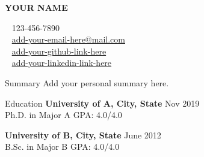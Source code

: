 \documentclass{resume} %
\begin{document}
\begin{minipage}{.6\textwidth}
\Huge \textbf{YOUR NAME}
\end{minipage}
\begin{minipage}{.4\textwidth}
\faPhone     ~ 123-456-7890 \\ 
\faEnvelopeO ~ \href{mailto:add-your-email-here@mail.com}{add-your-email-here@mail.com} \\
\faGithub    ~ \url{add-your-github-link-here}\\
\faLinkedin  ~ \url{add-your-linkedin-link-here}
\end{minipage}


\begin{rSection}{Summary}
Add your personal summary here.
\end{rSection}
\begin{rSection}{Education}
{\bf University of A, City, State}        \hfill {Nov 2019} \\ 
Ph.D. in Major A                          \hfill {GPA: 4.0/4.0}  

{\bf University of B, City, State}        \hfill {June 2012} \\ 
B.Sc. in Major B                          \hfill {GPA: 4.0/4.0}
\end{rSection}

\end{document}
